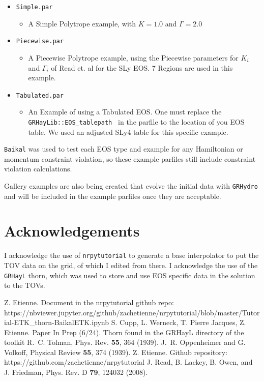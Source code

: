 \begin{itemize}
    \item \texttt{Simple.par }
    \begin{itemize}
    \item A Simple Polytrope example, with $K=1.0$ and $\Gamma=2.0$
    \end{itemize}
    \item \texttt{Piecewise.par }
    \begin{itemize}
    \item A Piecewise Polytrope example, using the Piecewise parameters for $K_i$ and $\Gamma_i$ of Read et. al for the SLy EOS.\cite{TOVola_TOVola_Read} 7 Regions are used in this example.
    \end{itemize}
    \item \texttt{Tabulated.par }
    \begin{itemize}
	    \item An Example of using a Tabulated EOS. One must replace the \texttt{GRHayLib::EOS\_tablepath } in the parfile to the location of you EOS table. We used an adjusted SLy4 table for this specific example.
    \end{itemize}
\end{itemize}

\texttt{Baikal} was used to test each EOS type and example for any Hamiltonian or momentum constraint violation, so these example parfiles still include constraint violation calculations.

Gallery examples are also being created that evolve the initial data with \texttt{GRHydro} and will be included in the example parfiles once they are acceptable.

\section{Acknowledgements}

I acknowledge the use of \texttt{nrpytutorial}\cite{TOVola_TOVola_NRpy} to generate a base interpolator to put the TOV data on the grid, of which I edited from there. I acknowledge the use of the \texttt{GRHayL} thorn, which was used to store and use EOS specific data in the solution to the TOVs.

\begin{thebibliography}{9}
Z. Etienne. Document in the nrpytutorial github repo: https://nbviewer.jupyter.org/github/zachetienne/nrpytutorial/blob/master/Tutorial-ETK\_thorn-BaikalETK.ipynb
%
S. Cupp, L. Werneck, T. Pierre Jacques, Z. Etienne. Paper In Prep (6/24). Thorn found in the GRHayL directory of the toolkit
%
R.~C. Tolman, Phys. Rev. {\bf 55}, 364 (1939).
%
J.~R. Oppenheimer and G. Volkoff, Physical Review {\bf 55}, 374 (1939).
%
Z. Etienne. Github repository: https://github.com/zachetienne/nrpytutorial
%
J. Read, B. Lackey, B. Owen, and J. Friedman, Phys. Rev. D {\bf 79}, 124032 (2008).
%
\end{thebibliography}




